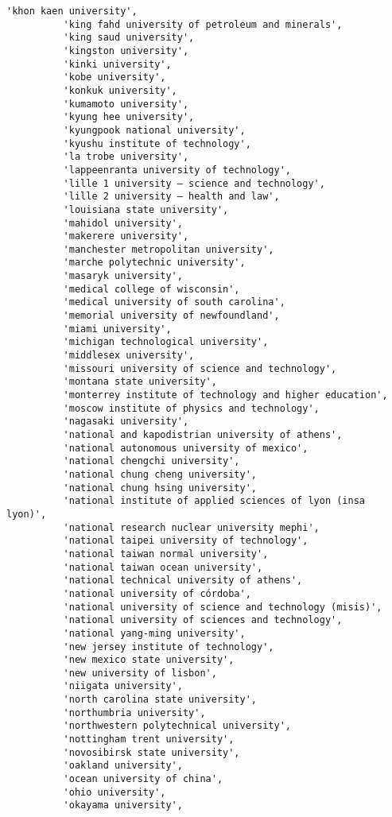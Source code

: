 \documentclass[11pt]{article}
\begin{document}
\begin{Verbatim}[commandchars=\\\{\}]
          'khon kaen university',
          'king fahd university of petroleum and minerals',
          'king saud university',
          'kingston university',
          'kinki university',
          'kobe university',
          'konkuk university',
          'kumamoto university',
          'kyung hee university',
          'kyungpook national university',
          'kyushu institute of technology',
          'la trobe university',
          'lappeenranta university of technology',
          'lille 1 university – science and technology',
          'lille 2 university – health and law',
          'louisiana state university',
          'mahidol university',
          'makerere university',
          'manchester metropolitan university',
          'marche polytechnic university',
          'masaryk university',
          'medical college of wisconsin',
          'medical university of south carolina',
          'memorial university of newfoundland',
          'miami university',
          'michigan technological university',
          'middlesex university',
          'missouri university of science and technology',
          'montana state university',
          'monterrey institute of technology and higher education',
          'moscow institute of physics and technology',
          'nagasaki university',
          'national and kapodistrian university of athens',
          'national autonomous university of mexico',
          'national chengchi university',
          'national chung cheng university',
          'national chung hsing university',
          'national institute of applied sciences of lyon (insa lyon)',
          'national research nuclear university mephi',
          'national taipei university of technology',
          'national taiwan normal university',
          'national taiwan ocean university',
          'national technical university of athens',
          'national university of córdoba',
          'national university of science and technology (misis)',
          'national university of sciences and technology',
          'national yang-ming university',
          'new jersey institute of technology',
          'new mexico state university',
          'new university of lisbon',
          'niigata university',
          'north carolina state university',
          'northumbria university',
          'northwestern polytechnical university',
          'nottingham trent university',
          'novosibirsk state university',
          'oakland university',
          'ocean university of china',
          'ohio university',
          'okayama university',

\end{Verbatim}
\end{document}
